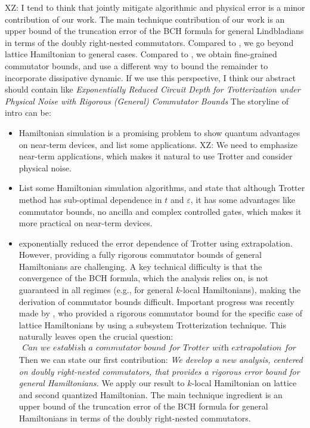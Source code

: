 \documentclass[11pt]{article}
\newcommand{\eps}{\varepsilon}
\newcommand{\xz}[1]{{\color{cyan} XZ: #1}}
\begin{document}
\xz{I tend to think that jointly mitigate algorithmic and physical error is a minor contribution of our work. The main technique contribution of our work is an upper bound of the truncation error of the BCH formula for general Lindbladians in terms of the doubly right-nested commutators. Compared to \cite{mizuta2025commutator}, we go beyond lattice Hamiltonian to general cases. Compared to \cite{fang2025high}, we obtain fine-grained commutator bounds, and use a different way to bound the remainder to incorporate dissipative dynamic.} 
If we use this perspective, I think our abstract should contain like \emph{Exponentially Reduced Circuit Depth for Trotterization under Physical Noise with Rigorous (General) Commutator Bounds}
The storyline of intro can be:
\begin{itemize}
    \item Hamiltonian simulation is a promising problem to show quantum advantages on near-term devices, and list some applications. \xz{We need to emphasize near-term applications, which makes it natural to use Trotter and consider physical noise. }
    \item List some Hamiltonian simulation algorithms, and state that although Trotter method has sub-optimal dependence in $t$ and $\eps$, it has some advantages like commutator bounds, no ancilla and complex controlled gates, which makes it more practical on near-term devices. 
    \item \citet{watson2025exponentially} exponentially reduced the error dependence of Trotter using extrapolation. However, providing a fully rigorous commutator bounds of general Hamiltonians are challenging. A key technical difficulty is that the convergence of the BCH formula, which the analysis relies on, is not guaranteed in all regimes (e.g., for general $k$-local Hamiltonians), making the derivation of commutator bounds difficult. Important progress was recently made by \citet{mizuta2025commutator}, who provided a rigorous commutator bound for the specific case of lattice Hamiltonians by using a subsystem Trotterization technique. This naturally leaves open the crucial question: \begin{align*}
        \textit{Can we establish a commutator bound for Trotter with extrapolation for general Hamiltonians? }
    \end{align*}  Then we can state our first contribution: \emph{We develop a new analysis, centered on doubly right-nested commutators, that provides a rigorous error bound for general Hamiltonians.} We apply our result to $k$-local Hamiltonian on lattice and second quantized Hamiltonian. The main technique ingredient is an upper bound of the truncation error of the BCH formula for general Hamiltonians in terms of the doubly right-nested commutators.

\end{itemize}
\end{document}
